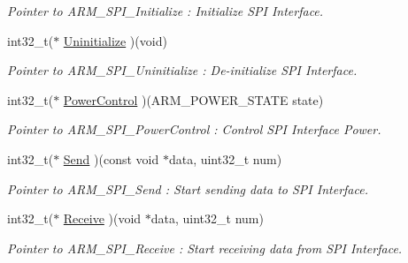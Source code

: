 \begin{DoxyCompactItemize}
\begin{DoxyCompactList}\small\item\em Pointer to A\+R\+M\+\_\+\+S\+P\+I\+\_\+\+Initialize \+: Initialize S\+PI Interface. \end{DoxyCompactList}\item 
\mbox{\label{struct___a_r_m___d_r_i_v_e_r___s_p_i_a5ce2b3d7a3a07099bf07d1eb253e92e3}} 
int32\+\_\+t($\ast$ \mbox{\hyperlink{struct___a_r_m___d_r_i_v_e_r___s_p_i_a5ce2b3d7a3a07099bf07d1eb253e92e3}{Uninitialize}} )(void)
\begin{DoxyCompactList}\small\item\em Pointer to A\+R\+M\+\_\+\+S\+P\+I\+\_\+\+Uninitialize \+: De-\/initialize S\+PI Interface. \end{DoxyCompactList}\item 
\mbox{\label{struct___a_r_m___d_r_i_v_e_r___s_p_i_a24ebae5c6011631f76027f9a16eaf5ce}} 
int32\+\_\+t($\ast$ \mbox{\hyperlink{struct___a_r_m___d_r_i_v_e_r___s_p_i_a24ebae5c6011631f76027f9a16eaf5ce}{Power\+Control}} )(A\+R\+M\+\_\+\+P\+O\+W\+E\+R\+\_\+\+S\+T\+A\+TE state)
\begin{DoxyCompactList}\small\item\em Pointer to A\+R\+M\+\_\+\+S\+P\+I\+\_\+\+Power\+Control \+: Control S\+PI Interface Power. \end{DoxyCompactList}\item 
\mbox{\label{struct___a_r_m___d_r_i_v_e_r___s_p_i_a6e880dae8e9733a3c0f152a131076ca4}} 
int32\+\_\+t($\ast$ \mbox{\hyperlink{struct___a_r_m___d_r_i_v_e_r___s_p_i_a6e880dae8e9733a3c0f152a131076ca4}{Send}} )(const void $\ast$data, uint32\+\_\+t num)
\begin{DoxyCompactList}\small\item\em Pointer to A\+R\+M\+\_\+\+S\+P\+I\+\_\+\+Send \+: Start sending data to S\+PI Interface. \end{DoxyCompactList}\item 
\mbox{\label{struct___a_r_m___d_r_i_v_e_r___s_p_i_a784cafe08ad8f9052dca8cd8071d2a9b}} 
int32\+\_\+t($\ast$ \mbox{\hyperlink{struct___a_r_m___d_r_i_v_e_r___s_p_i_a784cafe08ad8f9052dca8cd8071d2a9b}{Receive}} )(void $\ast$data, uint32\+\_\+t num)
\begin{DoxyCompactList}\small\item\em Pointer to A\+R\+M\+\_\+\+S\+P\+I\+\_\+\+Receive \+: Start receiving data from S\+PI Interface. \end{DoxyCompactList}\item 

\end{DoxyCompactItemize}
